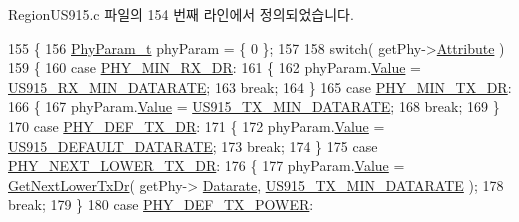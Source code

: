 Region\+U\+S915.\+c 파일의 154 번째 라인에서 정의되었습니다.


\begin{DoxyCode}
155 \{
156     \mbox{\hyperlink{unionu_phy_param}{PhyParam\_t}} phyParam = \{ 0 \};
157 
158     \textcolor{keywordflow}{switch}( getPhy->\mbox{\hyperlink{structs_get_phy_params_abdcb168ffd6913b85e2f635d7a475f2d}{Attribute}} )
159     \{
160         \textcolor{keywordflow}{case} \mbox{\hyperlink{group___r_e_g_i_o_n_gga51cbe8f5433d914fe9cf81b451de2c2da91cb5d84f937c32cd635dd7efe7a9d3a}{PHY\_MIN\_RX\_DR}}:
161         \{
162             phyParam.\mbox{\hyperlink{unionu_phy_param_a8e0dcce3428a8051614e852b8836d0d1}{Value}} = \mbox{\hyperlink{group___r_e_g_i_o_n_u_s915_ga44b4b0c33d7fbd6190937e2608b8ae71}{US915\_RX\_MIN\_DATARATE}};
163             \textcolor{keywordflow}{break};
164         \}
165         \textcolor{keywordflow}{case} \mbox{\hyperlink{group___r_e_g_i_o_n_gga51cbe8f5433d914fe9cf81b451de2c2daace3e56c88b40def8ed6a9106871e7de}{PHY\_MIN\_TX\_DR}}:
166         \{
167             phyParam.\mbox{\hyperlink{unionu_phy_param_a8e0dcce3428a8051614e852b8836d0d1}{Value}} = \mbox{\hyperlink{group___r_e_g_i_o_n_u_s915_ga82ad1f3ace520fc55727e442784bdcb6}{US915\_TX\_MIN\_DATARATE}};
168             \textcolor{keywordflow}{break};
169         \}
170         \textcolor{keywordflow}{case} \mbox{\hyperlink{group___r_e_g_i_o_n_gga51cbe8f5433d914fe9cf81b451de2c2da70c3923333165960549162e3dcf10467}{PHY\_DEF\_TX\_DR}}:
171         \{
172             phyParam.\mbox{\hyperlink{unionu_phy_param_a8e0dcce3428a8051614e852b8836d0d1}{Value}} = \mbox{\hyperlink{group___r_e_g_i_o_n_u_s915_ga30e4c5d41d52805a1ea76717e867d625}{US915\_DEFAULT\_DATARATE}};
173             \textcolor{keywordflow}{break};
174         \}
175         \textcolor{keywordflow}{case} \mbox{\hyperlink{group___r_e_g_i_o_n_gga51cbe8f5433d914fe9cf81b451de2c2dac002e7e492cf30dbf9c544b062f5cc8a}{PHY\_NEXT\_LOWER\_TX\_DR}}:
176         \{
177             phyParam.\mbox{\hyperlink{unionu_phy_param_a8e0dcce3428a8051614e852b8836d0d1}{Value}} = \mbox{\hyperlink{_region_u_s915_8c_ae06574681e2f7c3f3e604878c81743aa}{GetNextLowerTxDr}}( getPhy->
      \mbox{\hyperlink{structs_get_phy_params_ae2f6080f3aa0e9485c55513ca56bb24d}{Datarate}}, \mbox{\hyperlink{group___r_e_g_i_o_n_u_s915_ga82ad1f3ace520fc55727e442784bdcb6}{US915\_TX\_MIN\_DATARATE}} );
178             \textcolor{keywordflow}{break};
179         \}
180         \textcolor{keywordflow}{case} \mbox{\hyperlink{group___r_e_g_i_o_n_gga51cbe8f5433d914fe9cf81b451de2c2da18ae0d314f20c212f9e40207099ab1bb}{PHY\_DEF\_TX\_POWER}}:

\end{DoxyCode}
